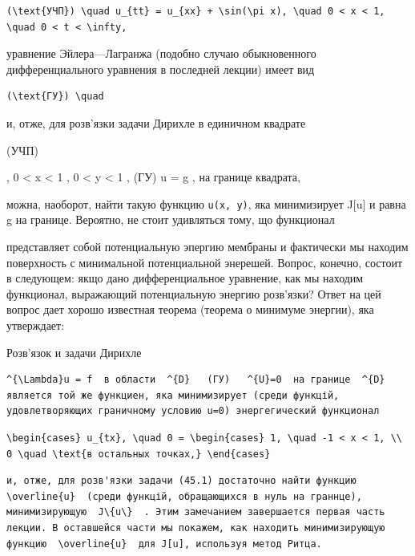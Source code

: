 \documentclass[
  ukrainian,
]{article}
\begin{document}
\begin{verbatim}
(\text{УЧП}) \quad u_{tt} = u_{xx} + \sin(\pi x), \quad 0 < x < 1, \quad 0 < t < \infty,
\end{verbatim}

уравнение Эйлера---Лагранжа (подобно случаю обыкновенного
дифференциального уравнения в последней лекции) имеет вид

\begin{verbatim}
(\text{ГУ}) \quad
\end{verbatim}

и, отже, для розв'язки задачи Дирихле в единичном квадрате

(УЧП)

, 0 \textless{} x \textless{} 1 , 0 \textless{} y \textless{} 1 , (ГУ) u
= g , на границе квадрата,

можна, наоборот, найти такую функцию \texttt{u(x,\ y)}, яка минимизирует
J{[}u{]} и равна g на границе. Вероятно, не стоит удивляться тому, що
функционал

представляет собой потенциальную эпергию мембраны и фактически мы
находим поверхность с минимальной потенциальной энерешей. Вопрос,
конечно, состоит в следующем: якщо дано дифференциальное уравнение, как
мы находим функционал, выражающий потенциальную энергию розв'язки? Ответ
на цей вопрос дает хорошо известная теорема (теорема о минимуме
энергии), яка утверждает:

Розв'язок и задачи Дирихле

\begin{verbatim}
^{\Lambda}u = f  в области  ^{D}   (ГУ)   ^{U}=0  на границе  ^{D}  является той же функциен, яка минимизирует (среди функцій, удовлетворяющих граничному условию u=0) энергегический функционал
\end{verbatim}

\begin{verbatim}
\begin{cases} u_{tx}, \quad 0 = \begin{cases} 1, \quad -1 < x < 1, \\ 0 \quad \text{в остальных точках,} \end{cases}
\end{verbatim}

\begin{verbatim}
и, отже, для розв'язки задачи (45.1) достаточно найти функцию  \overline{u}  (среди функцій, обращающихся в нуль на граннце), минимизирующую  J\{u\}  . Этим замечанием завершается первая часть лекции. В оставшейся части мы покажем, как находить минимизирующую функцию  \overline{u}  для J[u], используя метод Ритца.
\end{verbatim}
\end{document}

